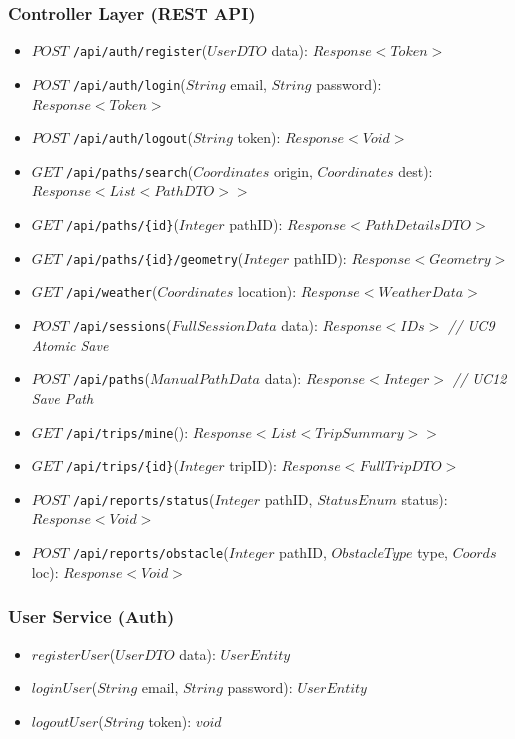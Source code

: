 \subsubsection*{Controller Layer (REST API)}
\begin{itemize}
    \item $POST$ \texttt{/api/auth/register}($UserDTO$ data): $Response<Token>$
    \item $POST$ \texttt{/api/auth/login}($String$ email, $String$ password): $Response<Token>$
    \item $POST$ \texttt{/api/auth/logout}($String$ token): $Response<Void>$
    \item $GET$ \texttt{/api/paths/search}($Coordinates$ origin, $Coordinates$ dest): $Response<List<PathDTO>>$
    \item $GET$ \texttt{/api/paths/\{id\}}($Integer$ pathID): $Response<PathDetailsDTO>$
    \item $GET$ \texttt{/api/paths/\{id\}/geometry}($Integer$ pathID): $Response<Geometry>$
    \item $GET$ \texttt{/api/weather}($Coordinates$ location): $Response<WeatherData>$
    \item $POST$ \texttt{/api/sessions}($FullSessionData$ data): $Response<IDs>$ \textit{// UC9 Atomic Save}
    \item $POST$ \texttt{/api/paths}($ManualPathData$ data): $Response<Integer>$ \textit{// UC12 Save Path}
    \item $GET$ \texttt{/api/trips/mine}(): $Response<List<TripSummary>>$
    \item $GET$ \texttt{/api/trips/\{id\}}($Integer$ tripID): $Response<FullTripDTO>$
    \item $POST$ \texttt{/api/reports/status}($Integer$ pathID, $StatusEnum$ status): $Response<Void>$
    \item $POST$ \texttt{/api/reports/obstacle}($Integer$ pathID, $ObstacleType$ type, $Coords$ loc): $Response<Void>$
\end{itemize}

\subsubsection*{User Service (Auth)}
\begin{itemize}
    \item $registerUser$($UserDTO$ data): $UserEntity$
    \item $loginUser$($String$ email, $String$ password): $UserEntity$
    \item $logoutUser$($String$ token): $void$
\end{itemize}

